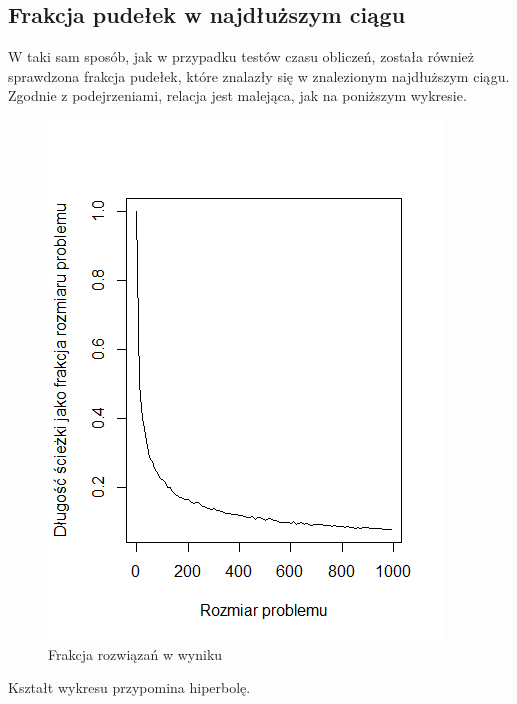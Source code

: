 \documentclass{article}
\begin{document}
\subsection{Frakcja pudełek w najdłuższym ciągu}
W taki sam sposób, jak w przypadku testów czasu obliczeń, została również sprawdzona frakcja pudełek, które znalazły się w znalezionym najdłuższym ciągu. Zgodnie z podejrzeniami, relacja jest malejąca, jak na poniższym wykresie.
\begin{figure}[H]
\centering
\includegraphics{dlugosc.png}
\caption{Frakcja rozwiązań w wyniku}
\end{figure}
Kształt wykresu przypomina hiperbolę.
\clearpage
\end{document}
